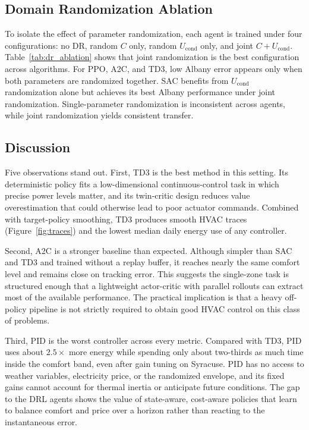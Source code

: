 \documentclass[conference]{IEEEtran}
\begin{document}
\subsection{Domain Randomization Ablation}
\label{subsec:ablation}

To isolate the effect of parameter randomization, each agent is trained
under four configurations: no DR, random $C$ only, random
$U_{\text{cond}}$ only, and joint $C{+}U_{\text{cond}}$.
Table~\ref{tab:dr_ablation} shows that joint randomization
is the best configuration across algorithms. For PPO, A2C, and TD3, low
Albany error appears only when both parameters are randomized together.
SAC benefits from $U_{\text{cond}}$ randomization alone but achieves
its best Albany performance under joint randomization. Single-parameter
randomization is inconsistent across agents, while joint randomization
yields consistent transfer.


\subsection{Discussion}
\label{subsec:discussion}

Five observations stand out. First, TD3 is the best method in this
setting. Its deterministic policy fits a low-dimensional
continuous-control task in which precise power levels matter, and its
twin-critic design reduces value overestimation that could otherwise
lead to poor actuator commands. Combined with target-policy smoothing,
TD3 produces smooth HVAC traces (Figure~\ref{fig:traces}) and the
lowest median daily energy use of any controller.

Second, A2C is a stronger baseline than expected. Although simpler than
SAC and TD3 and trained without a replay buffer, it reaches nearly the
same comfort level and remains close on tracking error. This suggests
the single-zone task is structured enough that a lightweight
actor-critic with parallel rollouts can extract most of the available
performance. The practical implication is that a heavy off-policy
pipeline is not strictly required to obtain good HVAC control on this
class of problems.

Third, PID is the worst controller across every metric. Compared with
TD3, PID uses about $2.5\times$ more energy while spending only about
two-thirds as much time inside the comfort band, even after gain tuning
on Syracuse. PID has no access to weather variables, electricity price,
or the randomized envelope, and its fixed gains cannot account for
thermal inertia or anticipate future conditions. The gap to the DRL
agents shows the value of state-aware, cost-aware policies that learn
to balance comfort and price over a horizon rather than reacting to the
instantaneous error.
\end{document}
